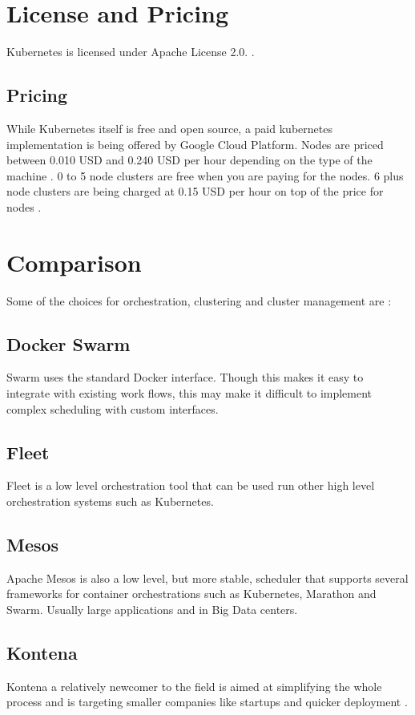 \documentclass[9pt,twocolumn,twoside]{styles/osajnl}
\begin{document}
\section{License and Pricing}
Kubernetes is licensed under Apache License 2.0. \cite{www-kuberneteslic}.

\subsection{Pricing}
While Kubernetes itself is free and open source, a paid kubernetes implementation is being offered by Google Cloud Platform.
Nodes are priced between 0.010 USD and 0.240 USD per hour depending on the type of the machine \cite{www-googlecontengpricing}.
0 to 5 node clusters are free when you are paying for the nodes.
6 plus node clusters are being charged at 0.15  USD per hour on top of the price for nodes \cite{www-googlecloudpricing}.
\section{Comparison}
Some of the choices for orchestration, clustering and cluster management are \cite{www-kubernetesarticle}:
\subsection{Docker Swarm}
 Swarm uses the standard  Docker interface. Though this makes it easy to integrate with existing work flows, this may make it difficult to implement complex scheduling with custom interfaces.
\subsection{Fleet}
Fleet is a low level orchestration tool that can be used run other high level orchestration systems such as Kubernetes.
\subsection{Mesos}
Apache Mesos is also a low level, but more stable, scheduler that supports several frameworks for container orchestrations such as Kubernetes, Marathon and Swarm. Usually large applications and in Big Data centers.
\subsection{Kontena}
Kontena a relatively newcomer to the field is aimed at simplifying the whole process and is targeting smaller companies like startups and quicker deployment \cite{www-kontenasite}.
\end{document}
